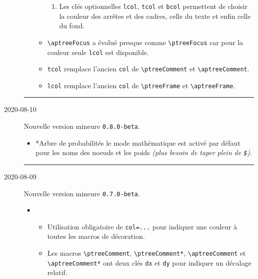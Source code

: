 \documentclass[12pt,a4paper]{article}
\makeatletter
\theoremstyle{definition}
\newcommand\topic{\@ifstar{\@topic@star}{\@topic@no@star}}
\newcommand\@topic@no@star[1]{%
    \textbf{\textsc{#1}.}%
}
\newcommand\@topic@star[1]{%
    \textbf{\textsc{#1} :}%
}
\newcommand\env[1]{\texttt{#1}}
\newcommand\macro[1]{\env{\textbackslash{}#1}}
\newcommand\separation{
    \medskip
    \hfill\rule{0.5\textwidth}{0.75pt}\hfill
    \medskip
}
\makeatother
\begin{document}
\begin{description}
\begin{itemize}[itemsep=.5em]
\begin{itemize}[itemsep=.5em]
\begin{enumerate}
            	\item Les clés optionnelles \verb#lcol#, \verb#tcol# et \verb#bcol# permettent de choisir la couleur des arrêtes et des cadres, celle du texte et enfin celle du fond.
            \end{enumerate}
    
    
            \item \macro{aptreeFocus} a évolué presque comme \macro{ptreeFocus} car pour la couleur seule \verb#lcol# est disponible.
    
    
            \item \verb#tcol# remplace l'ancien \verb#col# de \macro{ptreeComment} et \macro{aptreeComment}.
    
    		\item \verb#lcol# remplace l'ancien \verb#col# de \macro{ptreeFrame} et \macro{aptreeFrame}.
    
    
    
        \end{itemize}
    \end{itemize}
    
    
    \separation


    \medskip
    \item[2020-08-10] Nouvelle version mineure \verb+0.8.0-beta+.
    
    \begin{itemize}[itemsep=.5em]
        \item \topic*{Arbre de probabilités}
              le mode mathématique est activé par défaut pour les noms des noeuds et les poids \emph{(plus besoin de taper plein de \texttt{\$})}.
    \end{itemize}
    
    
    \separation

    \medskip
    \item[2020-08-09] Nouvelle version mineure \verb+0.7.0-beta+.
    
    \begin{itemize}[itemsep=.5em]
        \item \topic{Arbre de probabilités}
        \begin{itemize}[itemsep=.5em]
            \item Utilisation obligatoire de \verb#col=...# pour indiquer une couleur à toutes les macros de décoration.
            
            \item Les macros \macro{ptreeComment}, \macro{ptreeComment*}, 
                  \macro{aptreeComment} et \macro{aptreeComment*}
                  ont deux clés \verb#dx# et \verb#dy# pour indiquer un décalage relatif.
            

\end{itemize}
\end{itemize}
\end{description}
\end{document}

